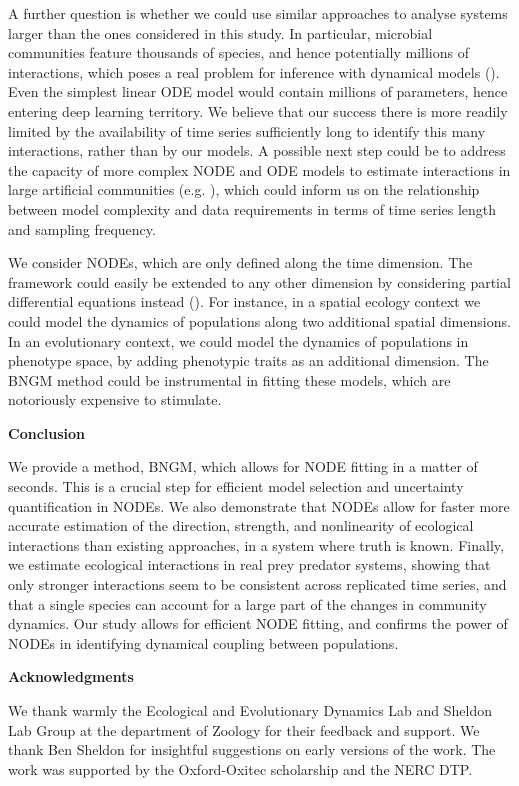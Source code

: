 \documentclass[11pt, oneside]{article}
\begin{document}
A further question is whether we could use similar approaches to analyse systems larger than the ones considered in this study.
In particular, microbial communities feature thousands of species, and hence potentially millions of interactions, which poses a real problem for inference with dynamical models (\cite{Ridenhour2017}).
Even the simplest linear ODE model would contain millions of parameters, hence entering deep learning territory.
We believe that our success there is more readily limited by the availability of time series sufficiently long to identify this many interactions, rather than by our models.
A possible next step could be to address the capacity of more complex NODE and ODE models to estimate interactions in large artificial communities (e.g. \cite{Coenen2020}), which could inform us on the relationship between model complexity and data requirements in terms of time series length and sampling frequency.

We consider NODEs, which are only defined along the time dimension.
The framework could easily be extended to any other dimension by considering partial differential equations instead (\cite{Rackauckas2019}).
For instance, in a spatial ecology context we could model the dynamics of populations along two additional spatial dimensions.
In an evolutionary context, we could model the dynamics of populations in phenotype space, by adding phenotypic traits as an additional dimension.
The BNGM method could be instrumental in fitting these models, which are notoriously expensive to stimulate.

\textbf{Conclusion}

We provide a method, BNGM, which allows for NODE fitting in a matter of seconds.
This is a crucial step for efficient model selection and uncertainty quantification in NODEs.
We also demonstrate that NODEs allow for faster more accurate estimation of the direction, strength, and nonlinearity of ecological interactions than existing approaches, in a system where truth is known.
Finally, we estimate ecological interactions in real prey predator systems, showing that only stronger interactions seem to be consistent across replicated time series, and that a single species can account for a large part of the changes in community dynamics.
Our study allows for efficient NODE fitting, and confirms the power of NODEs in identifying dynamical coupling between populations. 

\textbf{Acknowledgments}

We thank warmly the Ecological and Evolutionary Dynamics Lab and Sheldon Lab Group at the department of Zoology for their feedback and support.
We thank Ben Sheldon for insightful suggestions on early versions of the work.
The work was supported by the Oxford-Oxitec scholarship and the NERC DTP.
\end{document}
